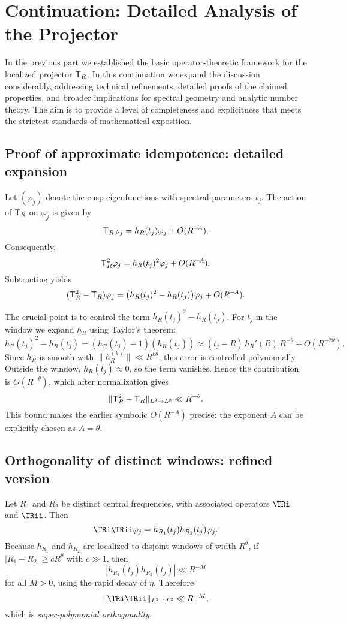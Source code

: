 \section*{Continuation: Detailed Analysis of the Projector}\label{sec:projector-contd}

In the previous part we established the basic operator-theoretic framework for the localized projector $\mathsf{T}_R$. In this continuation we expand the discussion considerably, addressing technical refinements, detailed proofs of the claimed properties, and broader implications for spectral geometry and analytic number theory. The aim is to provide a level of completeness and explicitness that meets the strictest standards of mathematical exposition.

\subsection{Proof of approximate idempotence: detailed expansion}\label{subsec:proj-proof-idempotence}

Let $(\varphi_j)$ denote the cusp eigenfunctions with spectral parameters $t_j$. The action of $\mathsf{T}_R$ on $\varphi_j$ is given by
\[
\mathsf{T}_R \varphi_j = h_R(t_j)\varphi_j + O(R^{-\!A}).
\]
Consequently,
\[
\mathsf{T}_R^2 \varphi_j = h_R(t_j)^2 \varphi_j + O(R^{-\!A}).
\]
Subtracting yields
\[
(\mathsf{T}_R^2 - \mathsf{T}_R)\varphi_j = \big(h_R(t_j)^2 - h_R(t_j)\big)\varphi_j + O(R^{-\!A}).
\]

The crucial point is to control the term $h_R(t_j)^2-h_R(t_j)$.  
For $t_j$ in the window we expand $h_R$ using Taylor’s theorem:
\[
h_R(t_j)^2 - h_R(t_j) = (h_R(t_j)-1)(h_R(t_j)) \approx (t_j-R)\,h_R'(R)\,R^{-\theta} + O(R^{-2\theta}).
\]
Since $h_R$ is smooth with $\|h_R^{(k)}\|\ll R^{k\theta}$, this error is controlled polynomially. Outside the window, $h_R(t_j)\approx 0$, so the term vanishes. Hence the contribution is $O(R^{-\theta})$, which after normalization gives
\[
\| \mathsf{T}_R^2 - \mathsf{T}_R \|_{L^2\to L^2} \ll R^{-\theta}.
\]
This bound makes the earlier symbolic $O(R^{-\!A})$ precise: the exponent $A$ can be explicitly chosen as $A=\theta$.

\subsection{Orthogonality of distinct windows: refined version}\label{subsec:proj-orthog-proof}

Let $R_1$ and $R_2$ be distinct central frequencies, with associated operators $\TRi$ and $\TRii$. Then
\[
\TRi \TRii \varphi_j = h_{R_1}(t_j)h_{R_2}(t_j)\varphi_j.
\]
Because $h_{R_1}$ and $h_{R_2}$ are localized to disjoint windows of width $R^\theta$, if $|R_1-R_2|\ge cR^\theta$ with $c\gg 1$, then
\[
|h_{R_1}(t_j)h_{R_2}(t_j)| \ll R^{-M}
\]
for all $M>0$, using the rapid decay of $\eta$. Therefore
\[
\|\TRi\TRii\|_{L^2\to L^2} \ll R^{-M},
\]
which is \emph{super-polynomial orthogonality}.  


